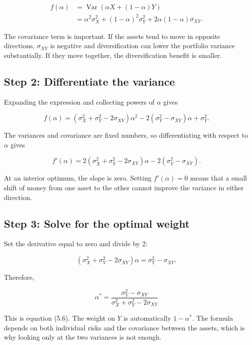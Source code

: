 \documentclass[
  11pt,
]{article}
\begin{document}
\[
\begin{aligned}
f(\alpha)
  &= \operatorname{Var}\left(\alpha X + (1-\alpha)Y\right) \\
  &= \alpha^2\sigma_X^2 + (1-\alpha)^2\sigma_Y^2
     + 2\alpha(1-\alpha)\sigma_{XY}.
\end{aligned}
\]

The covariance term is important. If the assets tend to move in opposite
directions, \(\sigma_{XY}\) is negative and diversification can lower
the portfolio variance substantially. If they move together, the
diversification benefit is smaller.

\subsection{Step 2: Differentiate the
variance}\label{step-2-differentiate-the-variance}

Expanding the expression and collecting powers of \(\alpha\) gives

\[
f(\alpha) =
\left(\sigma_X^2 + \sigma_Y^2 - 2\sigma_{XY}\right)\alpha^2
- 2\left(\sigma_Y^2 - \sigma_{XY}\right)\alpha
+ \sigma_Y^2.
\]

The variances and covariance are fixed numbers, so differentiating with
respect to \(\alpha\) gives

\[
f'(\alpha) =
2\left(\sigma_X^2 + \sigma_Y^2 - 2\sigma_{XY}\right)\alpha
- 2\left(\sigma_Y^2 - \sigma_{XY}\right).
\]

At an interior optimum, the slope is zero. Setting \(f'(\alpha)=0\)
means that a small shift of money from one asset to the other cannot
improve the variance in either direction.

\subsection{Step 3: Solve for the optimal
weight}\label{step-3-solve-for-the-optimal-weight}

Set the derivative equal to zero and divide by 2:

\[
\left(\sigma_X^2 + \sigma_Y^2 - 2\sigma_{XY}\right)\alpha
= \sigma_Y^2 - \sigma_{XY}.
\]

Therefore,

\[
\boxed{
\alpha^* =
\frac{\sigma_Y^2 - \sigma_{XY}}
{\sigma_X^2 + \sigma_Y^2 - 2\sigma_{XY}}
}
\]

This is equation (5.6). The weight on \(Y\) is automatically
\(1-\alpha^*\). The formula depends on both individual risks and the
covariance between the assets, which is why looking only at the two
variances is not enough.
\end{document}
